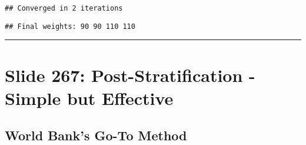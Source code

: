 \documentclass[
]{article}
\newenvironment{Shaded}{\begin{snugshade}}{\end{snugshade}}
\newcommand{\FunctionTok}[1]{\textcolor[rgb]{0.13,0.29,0.53}{\textbf{#1}}}
\newcommand{\NormalTok}[1]{#1}
\newcommand{\OtherTok}[1]{\textcolor[rgb]{0.56,0.35,0.01}{#1}}
\newcommand{\SpecialCharTok}[1]{\textcolor[rgb]{0.81,0.36,0.00}{\textbf{#1}}}
\newcommand{\StringTok}[1]{\textcolor[rgb]{0.31,0.60,0.02}{#1}}
\begin{document}
\begin{Shaded}
\end{Shaded}

\begin{verbatim}
## Converged in 2 iterations
\end{verbatim}

\begin{Shaded}
\end{Shaded}

\begin{verbatim}
## Final weights: 90 90 110 110
\end{verbatim}

\begin{center}\rule{0.5\linewidth}{0.5pt}\end{center}

\section{Slide 267: Post-Stratification - Simple but
Effective}\label{slide-267-post-stratification---simple-but-effective}

\subsection{World Bank's Go-To Method}\label{world-banks-go-to-method}
\end{document}
